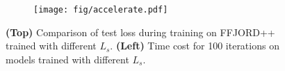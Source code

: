 \begin{figure}[!t]
    \centering
    \begin{subfigure}{0.5\textwidth}
        \centering
        \hspace{-0.7cm}
        \texttt{[image: fig/accelerate.pdf]}
    \end{subfigure}
    \begin{subfigure}{0.5\textwidth}
        \centering
        \vspace{2mm}
        \hspace{-0.5cm}
        \label{tab: cost}
    \end{subfigure}
    \label{fig: shared_step}
    \caption{\small \textbf{(Top)} Comparison of test loss during training on FFJORD++ trained with different $L_s$. \textbf{(Left)} Time cost for 100 iterations on models trained with different $L_s$.}
    \label{fig: ablation}
    \vspace{-6mm}
\end{figure}


